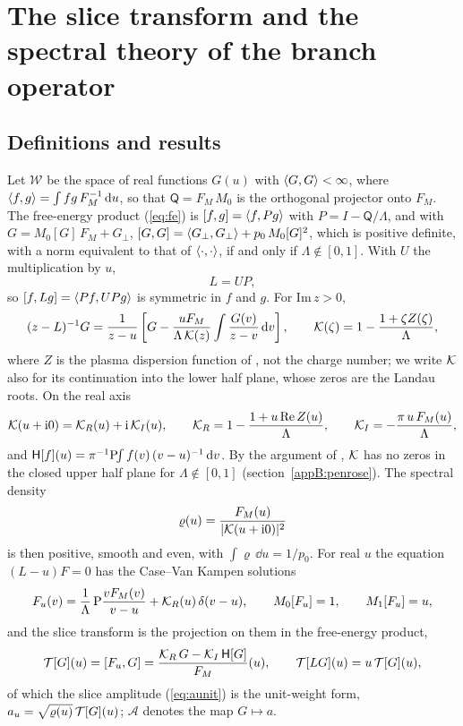 \section{The slice transform and the spectral theory of the branch operator}\label{app:spectral}

\subsection{Definitions and results}\label{appB:defs}

Let $\mathcal W$ be the space of real functions $G(u)$ with $\langle G,G\rangle<\infty$, where $\langle f,g\rangle=\int fg\,F_M^{-1}\,\mathrm{d} u$, so that $\mathsf Q=F_M\,M_0$ is the orthogonal projector onto $F_M$. The free-energy product (\ref{eq:fe}) is $[f,g]=\langle f,Pg\rangle$ with $P=I-\mathsf Q/\Lambda$, and with $G=M_0[G]\,F_M+G_\perp$, $[G,G]=\langle G_\perp,G_\perp\rangle+p_0\,M_0[G]^2$, which is positive definite, with a norm equivalent to that of $\langle \cdot,\cdot\rangle$, if and only if $\Lambda\notin[0,1]$. With $U$ the multiplication by $u$,
\begin{equation}\label{eq:LUP}
  L=UP ,
\end{equation}
so $[f,Lg]=\langle Pf,UPg\rangle$ is symmetric in $f$ and $g$. For $\mathrm{Im}\,z>0$,
\begin{equation}\label{sl:resolvent}
  (z-L)^{-1}G=\frac{1}{z-u}\left[G-\frac{uF_M}{\Lambda\,\mathcal K(z)}\int\frac{G(v)}{z-v}\,\mathrm{d} v\right],\qquad
  \mathcal K(\zeta)=1-\frac{1+\zeta Z(\zeta)}{\Lambda},
\end{equation}
where $Z$ is the plasma dispersion function of \citet{FriedConte1961}, not the charge number; we write $\mathcal K$ also for its continuation into the lower half plane, whose zeros are the Landau roots. On the real axis
\begin{equation}\label{sl:epsRI}
  \mathcal K(u+\mathrm{i}0)=\mathcal K_R(u)+\mathrm{i}\,\mathcal K_I(u),\qquad
  \mathcal K_R=1-\frac{1+u\,\mathrm{Re}\,Z(u)}{\Lambda},\qquad
  \mathcal K_I=-\frac{\pi\,u\,F_M(u)}{\Lambda},
\end{equation}
and $\mathsf H[f](u)=\pi^{-1}\mathrm{P}\!\!\int f(v)\,(v-u)^{-1}\,\mathrm{d} v$. By the argument of \citet{Penrose1960}, $\mathcal K$ has no zeros in the closed upper half plane for $\Lambda\notin[0,1]$ (section~\ref{appB:penrose}). The spectral density
\begin{equation}\label{eq:varrho}
  \varrho(u)=\frac{F_M(u)}{|\mathcal K(u+\mathrm{i}0)|^2}
\end{equation}
is then positive, smooth and even, with $\int\varrho\,\dd u=1/p_0$. For real $u$ the equation $(L-u)F=0$ has the Case--Van Kampen solutions
\begin{equation}\label{sl:Fu}
  F_u(v)=\frac{1}{\Lambda}\,\mathrm P\frac{vF_M(v)}{v-u}+\mathcal K_R(u)\,\delta(v-u),\qquad M_0[F_u]=1,\qquad M_1[F_u]=u,
\end{equation}
and the slice transform is the projection on them in the free-energy product,
\begin{equation}\label{eq:transform}
  \mathcal T[G](u)=[F_u,G]=\frac{\mathcal K_R\,G-\mathcal K_I\,\mathsf H[G]}{F_M}(u),\qquad \mathcal T[LG](u)=u\,\mathcal T[G](u),
\end{equation}
of which the slice amplitude (\ref{eq:aunit}) is the unit-weight form, $a_u=\sqrt{\varrho(u)}\,\mathcal T[G](u)$; $\mathcal A$ denotes the map $G\mapsto a$.

